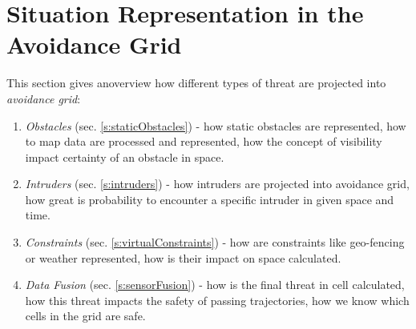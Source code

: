\cleardoublepage
\section{Situation Representation in the Avoidance Grid}\label{sec:situationAssessment}
\noindent This section gives anoverview how different types of threat are projected into \emph{avoidance grid}:

\begin{enumerate}
	\item\emph{Obstacles} (sec. \ref{s:staticObstacles}) - how static obstacles are represented, how to map data are processed and represented, how the concept of visibility impact certainty of an obstacle in space.
	
	\item\emph{Intruders} (sec. \ref{s:intruders}) - how intruders are projected into avoidance grid, how great is probability to encounter a specific intruder in given space and time.
	
	\item\emph{Constraints} (sec. \ref{s:virtualConstraints}) - how are constraints like geo-fencing or weather represented, how is their impact on space calculated.
	
	\item\emph{Data Fusion} (sec. \ref{s:sensorFusion}) - how is the final threat in cell calculated, how this threat impacts the safety of passing trajectories, how we know which cells in the grid are safe.
\end{enumerate}